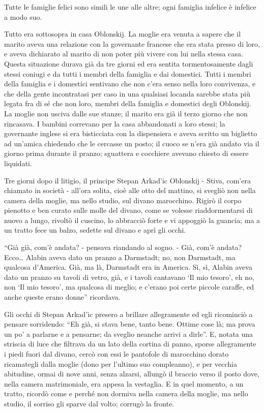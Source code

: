 \label{parte-prima}
\pagestyle{pagina}

\label{i}

Tutte le famiglie felici sono simili le une alle altre; ogni famiglia infelice è infelice a modo suo.

Tutto era sottosopra in casa Oblonskij. La moglie era venuta a sapere che il marito aveva una relazione con la governante francese che era stata presso di loro, e aveva dichiarato al marito di non poter più vivere con lui nella stessa casa. Questa situazione durava già da tre giorni ed era sentita tormentosamente dagli stessi coniugi e da tutti i membri della famiglia e dai domestici. Tutti i membri della famiglia e i domestici sentivano che non c'era senso nella loro convivenza, e che della gente incontratasi per caso in una qualsiasi locanda sarebbe stata più legata fra di sé che non loro, membri della famiglia e domestici degli Oblonskij. La moglie non usciva dalle sue stanze; il marito era già il terzo giorno che non rincasava. I bambini correvano per la casa abbandonati a loro stessi; la governante inglese si era bisticciata con la dispensiera e aveva scritto un biglietto ad un'amica chiedendo che le cercasse un posto; il cuoco se n'era già andato via il giorno prima durante il pranzo; sguattera e cocchiere avevano chiesto di essere liquidati. 

Tre giorni dopo il litigio, il principe Stepan Arkad'ic Oblonskij - Stiva, com'era chiamato in società - all'ora solita, cioè alle otto del mattino, si svegliò non nella camera della moglie, ma nello studio, sul divano marocchino. Rigirò il corpo pienotto e ben curato sulle molle del divano, come se volesse riaddormentarsi di nuovo a lungo, rivoltò il cuscino, lo abbracciò forte e vi appoggiò la guancia; ma a un tratto fece un balzo, sedette sul divano e aprì gli occhi. 

``Già già, com'è andata? - pensava riandando al sogno. - Già, com'è andata? Ecco\ldots{} Alabin aveva dato un pranzo a Darmstadt; no, non Darmstadt, ma qualcosa d'America. Già, ma là, Darmstadt era in America. Sì, sì, Alabin aveva dato un pranzo su tavoli di vetro, già, e i tavoli cantavano `Il mio tesoro', eh no, non `Il mio tesoro', ma qualcosa di meglio; e c'erano poi certe piccole caraffe, ed anche queste erano donne'' ricordava. 

Gli occhi di Stepan Arkad'ic presero a brillare allegramente ed egli ricominciò a pensare sorridendo: ``Eh già, si stava bene, tanto bene. Ottime cose là; ma prova un po' a parlarne e a pensarne; da sveglio neanche arrivi a dirle''. E, notata una striscia di luce che filtrava da un lato della cortina di panno, sporse allegramente i piedi fuori dal divano, cercò con essi le pantofole di marocchino dorato ricamategli dalla moglie (dono per l'ultimo suo compleanno), e per vecchia abitudine, ormai di nove anni, senza alzarsi, allungò il braccio verso il posto dove, nella camera matrimoniale, era appesa la vestaglia. E in quel momento, a un tratto, ricordò come e perché non dormiva nella camera della moglie, ma nello studio, il sorriso gli sparve dal volto; corrugò la fronte. 

